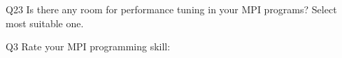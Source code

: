 \begin{description}%
\item{Q23} Is there any room for performance tuning in your MPI programs? Select most suitable one.%
\item{Q3} Rate your MPI programming skill:%
\end{description}%
